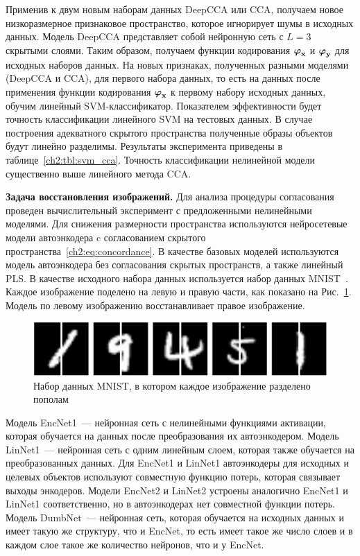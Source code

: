 Применив к двум новым наборам данных DeepCCA или CCA, получаем новое низкоразмерное признаковое пространство, которое игнорирует шумы в исходных данных. Модель DeepCCA представляет собой нейронную сеть с $L=3$ скрытыми слоями. Таким образом, получаем функции кодирования $\boldsymbol{\varphi}_{\mathbf{x}}$ и $\boldsymbol{\varphi}_{\mathbf{y}}$ для исходных наборов данных. На новых признаках, полученных разными моделями (DeepCCA и CCA), для первого набора данных, то есть на данных после применения функции кодирования $\boldsymbol{\varphi}_{\mathbf{x}}$ к первому набору исходных данных, обучим линейный SVM-классификатор. Показателем эффективности будет точность классификации линейного SVM на тестовых данных. В случае построения адекватного скрытого пространства полученные образы объектов будут линейно разделимы. Результаты эксперимента приведены в таблице~\ref{ch2:tbl:svm_cca}. Точность классификации нелинейной модели существенно выше линейного метода CCA.

\textbf{Задача восстановления изображений.}
Для анализа процедуры согласования проведен вычислительный эксперимент с предложенными нелинейными моделями.
Для снижения размерности пространства используются нейросетевые модели автоэнкодера c согласованием скрытого пространства~\eqref{ch2:eq:concordance}.
В качестве базовых моделей используются модель автоэнкодера без согласования скрытых пространств, а также линейный PLS. В качестве исходного набора данных используется набор данных MNIST~\cite{MNIST}. Каждое изображение поделено на левую и правую части, как показано на Рис.~\ref{ch2:fig:left_right_mnist}. Модель по левому изображению восстанавливает правое изображение.

\begin{figure}[ht]
\centering \includegraphics[width=\linewidth]{figs/ch2/left_right_mnist}
\caption{Набор данных MNIST, в котором каждое изображение разделено пополам}
\label{ch2:fig:left_right_mnist}
\end{figure}

Модель EncNet1~--- нейронная сеть с нелинейными функциями активации, которая обучается на данных после преобразования их автоэнкодером. Модель LinNet1~--- нейронная сеть с одним линейным слоем, которая также обучается на преобразованных данных. Для EncNet1 и LinNet1 автоэнкодеры для исходных и целевых объектов используют совместную функцию потерь, которая связывает выходы энкодеров. Модели EncNet2 и LinNet2 устроены аналогично EncNet1 и LinNet1 соответственно, но в автоэнкодерах нет совместной функции потерь. Модель DumbNet~---  нейронная сеть, которая обучается на исходных данных и имеет такую же структуру, что и EncNet, то есть имеет такое же число слоев и в каждом слое такое же количество нейронов, что и у EncNet.

